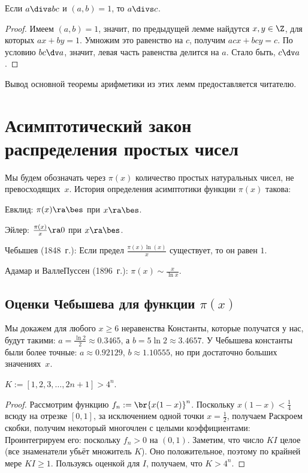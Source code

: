\documentclass[a4paper]{article}
\begin{document}
\begin{lemma}\label{lem:div}
Если $a\divs bc$ и $(a,b)=1$, то $a\divs c$.
\end{lemma}
\begin{proof}
    Имеем $(a,b)=1$, значит, по предыдущей лемме найдутся $x,y \in \Z$, для которых $ax+by=1$. Умножим это равенство
    на $c$, получим $acx+bcy=c$. По условию $bc\dv a$, значит, левая часть равенства делится на $a$. Стало быть, $c\dv a$.
\end{proof}

Вывод основной теоремы арифметики из этих лемм предоставляется читателю.

\section{Асимптотический закон распределения простых чисел}

Мы будем обозначать через $\pi(x)$ количество простых натуральных чисел, не превосходящих~$x$.
История определения асимптотики функции $\pi(x)$ такова:

\begin{items}{-2}
\item Евклид: $\pi(x) \ra \bes$ при $x\ra \bes$.
\item Эйлер: $\frac{\pi(x)}x \ra 0$ при $x \ra \bes$.
\item Чебышев (1848~г.): Если предел $\frac{\pi(x)\ln(x)}{x}$ существует, то он равен $1$.
\item Адамар и Валле\д Пуссен (1896~г.): $\pi(x)\sim \frac{x}{\ln x}$.
\end{items}

\subsection{Оценки Чебышева для функции $\pi(x)$}

Мы докажем для любого $x\ge 6$ неравенства
Константы, которые получатся у нас, будут такими: $a=\frac{\ln2}2\approx0.3465$, а $b=5\ln2\approx3.4657$.
У Чебышева константы были более точные: $a\approx0.92129$, $b\approx1.10555$, но при достаточно больших значениях~$x$.

\begin{lemma}
    $K:=[1,2,3,\dots,2n+1]>4^n$.
\end{lemma}
\begin{proof}
Рассмотрим функцию $f_n := \br{x(1-x)}^n$.
Поскольку $x(1-x) < \frac14$ всюду на отрезке $[0,1]$, за исключением одной точки $x=\frac12$, получаем
Раскроем скобки, получим некоторый многочлен с целыми коэффициентами:
Проинтегрируем его:
поскольку $f_n > 0$ на $(0,1)$.
Заметим, что число $KI$ целое (все знаменатели убьёт множитель $K$). Оно положительное,
поэтому по крайней мере $KI \ge 1$. Пользуясь оценкой для $I$, получаем, что $K > 4^n$.
\end{proof}
\end{document}
